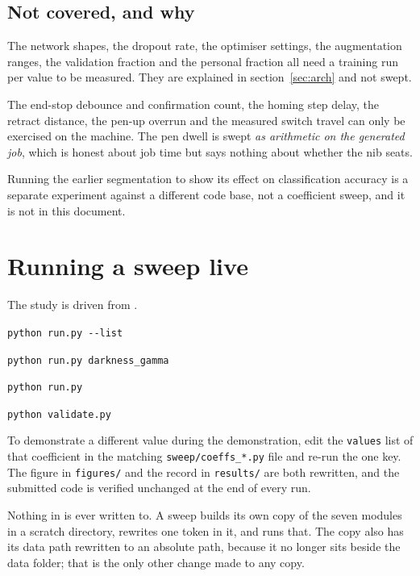 \documentclass[11pt,a4paper]{article}
\begin{document}
\subsection{Not covered, and why}

\begin{description}[leftmargin=2em]
\item[Anything requiring retraining] The network shapes, the dropout rate, the
optimiser settings, the augmentation ranges, the validation fraction and the
personal fraction all need a training run per value to be measured. They are
explained in section~\ref{sec:arch} and not swept.
\item[Anything requiring the gantry] The end-stop debounce and confirmation
count, the homing step delay, the retract distance, the pen-up overrun and the
measured switch travel can only be exercised on the machine. The pen dwell is
swept \emph{as arithmetic on the generated job}, which is honest about job time
but says nothing about whether the nib seats.
\item[The old segmentation comparison] Running the earlier segmentation to show
its effect on classification accuracy is a separate experiment against a
different code base, not a coefficient sweep, and it is not in this document.
\end{description}

\section{Running a sweep live}
\label{sec:demo}

The study is driven from
.

\begin{description}[leftmargin=2em]
\item[List every coefficient] \texttt{python run.py -{}-list}
\item[Sweep one coefficient] \texttt{python run.py darkness\_gamma}
\item[Sweep everything] \texttt{python run.py}
\item[Check the patch targets] \texttt{python validate.py}
\end{description}

To demonstrate a different value during the demonstration, edit the
\texttt{values} list of that coefficient in the matching
\texttt{sweep/coeffs\_*.py} file and re-run the one key. The figure in
\texttt{figures/} and the record in \texttt{results/} are both rewritten, and
the submitted code is verified unchanged at the end of every run.

Nothing in  is ever written to. A
sweep builds its own copy of the seven modules in a scratch directory, rewrites
one token in it, and runs that. The copy also has its data path rewritten to an
absolute path, because it no longer sits beside the data folder; that is the
only other change made to any copy.

\clearpage


\end{document}
